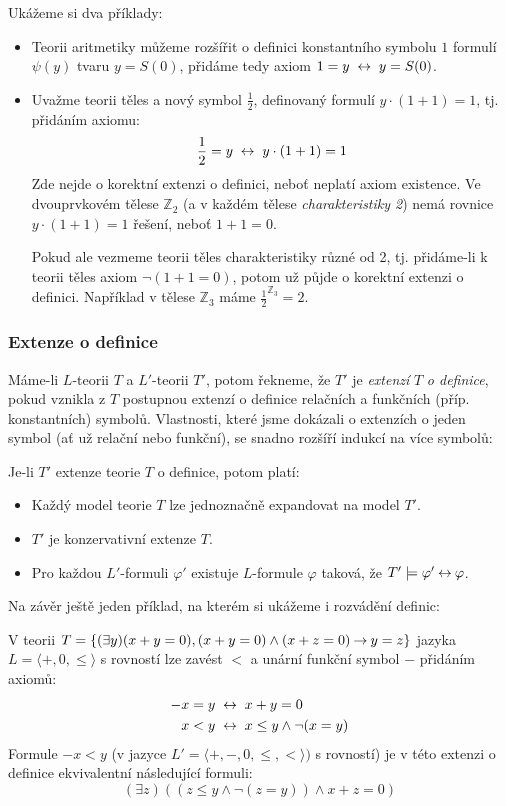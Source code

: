 \begin{example}
    Ukážeme si dva příklady:
    \begin{itemize}
        \item Teorii aritmetiky můžeme rozšířit o definici konstantního symbolu $1$ formulí $\psi(y)$ tvaru $y=S(0)$, přidáme tedy axiom $1=y\ \liff\ y=S(0)$.
        \item Uvažme teorii těles a nový symbol $\frac{1}{2}$, definovaný formulí $y\cdot (1+1)=1$, tj. přidáním axiomu: 
        $$
        \frac{1}{2}=y\ \liff\ y\cdot (1+1)=1
        $$
        Zde nejde o korektní extenzi o definici, neboť neplatí axiom existence. Ve dvouprvkovém tělese $\mathbb Z_2$ (a v každém tělese \emph{charakteristiky 2}) nemá rovnice $y\cdot (1+1)=1$ řešení, neboť $1+1=0$.
        
        
        Pokud ale vezmeme teorii těles charakteristiky různé od 2, tj. přidáme-li k teorii těles axiom $\neg (1+1=0)$, potom už půjde o korektní extenzi o definici. Například v tělese $\mathbb Z_3$ máme $\frac{1}{2}^{\mathbb Z_3}=2$.
    \end{itemize}
\end{example}


\subsubsection*{Extenze o definice}

Máme-li $L$-teorii $T$ a $L'$-teorii $T'$, potom řekneme, že $T'$ je  \emph{extenzí} $T$ \emph{o definice}, pokud vznikla z $T$ postupnou extenzí o definice relačních a funkčních (příp. konstantních) symbolů. Vlastnosti, které jsme dokázali o extenzích o jeden symbol (ať už relační nebo funkční), se snadno rozšíří indukcí na více symbolů:

\begin{corollary}
   Je-li $T'$ extenze teorie $T$ o definice, potom platí:
   \begin{itemize}
    \item Každý model teorie $T$ lze jednoznačně expandovat na model $T'$.
    \item $T'$ je konzervativní extenze $T$.
    \item Pro každou $L'$-formuli $\varphi'$ existuje $L$-formule $\varphi$ taková, že $T'\models\varphi'\mathbin{\leftrightarrow}\varphi$.
   \end{itemize} 
\end{corollary}

Na závěr ještě jeden příklad, na kterém si ukážeme i rozvádění definic:
\begin{example}
    V teorii $T=\{(\exists y)(x+y=0),(x+y=0)\land(x+z=0)\mathbin{\rightarrow} y=z\}$ jazyka $L=\langle +,0,\leq\rangle$ s rovností lze zavést $<$ a unární funkční symbol $-$ přidáním axiomů:
    \begin{align*}
        -x=y\ &\mathbin{\leftrightarrow}\ x+y=0\\
        x<y\ &\mathbin{\leftrightarrow}\ x\leq y\land\neg(x=y)
    \end{align*}
    Formule $-x<y$ (v jazyce $L'=\langle +,-,0,\leq,<\rangle)$ s rovností) je v této extenzi o definice ekvivalentní následující formuli:
    $$
    (\exists z)((z\leq y\land\neg(z=y))\land x+z=0)
    $$
\end{example}


